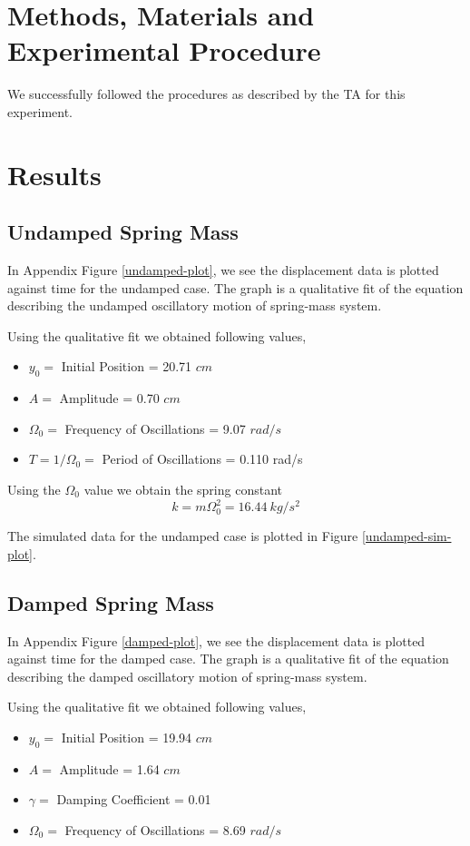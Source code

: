 \documentclass[letterpaper,12pt]{article}
\begin{document}
\section{Methods, Materials and Experimental Procedure}

We successfully followed the procedures as described by the TA for this experiment.

\section{Results}
\subsection{Undamped Spring Mass}

In Appendix Figure \ref{undamped-plot}, we see the displacement data is 
plotted against time for the undamped case. The graph is a qualitative fit 
of the equation describing the undamped oscillatory motion of spring-mass system.

Using the qualitative fit we obtained following values,
\begin{itemize}
  \item[] $y_0=$ Initial Position = 20.71 $cm$
  \item[] $A=$ Amplitude = 0.70 $cm$
  \item[] $\Omega_0=$ Frequency of Oscillations = 9.07 $rad/s$
  \item[] $T = 1/\Omega_0 =$ Period of Oscillations = 0.110 rad/s
\end{itemize}

Using the $\Omega_0$ value we obtain the spring constant $$k = m \Omega^2_0 = 16.44\ kg/s^2$$

The simulated data for the undamped case is plotted in Figure \ref{undamped-sim-plot}. 

\subsection{Damped Spring Mass}

In Appendix Figure \ref{damped-plot}, we see the displacement data is 
plotted against time for the damped case. The graph is a qualitative fit 
of the equation describing the damped oscillatory motion of spring-mass system.

Using the qualitative fit we obtained following values,
\begin{itemize}
  \item[] $y_0=$ Initial Position = 19.94 $cm$
  \item[] $A=$ Amplitude = 1.64 $cm$
  \item[] $\gamma=$ Damping Coefficient = 0.01
  \item[] $\Omega_0=$ Frequency of Oscillations = 8.69 $rad/s$
\end{itemize}
\end{document}
